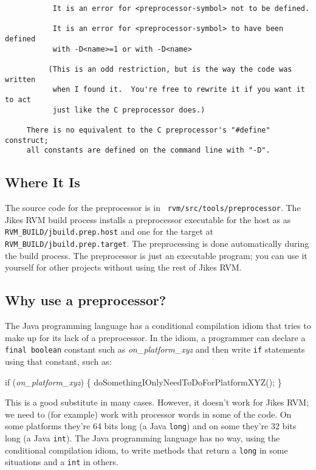\begin{verbatim}
           It is an error for <preprocessor-symbol> not to be defined.

           It is an error for <preprocessor-symbol> to have been defined
           with -D<name>=1 or with -D<name>

          (This is an odd restriction, but is the way the code was written
           when I found it.  You're free to rewrite it if you want it to act
           just like the C preprocessor does.)

     There is no equivalent to the C preprocessor's "#define" construct;
     all constants are defined on the command line with "-D".
\end{verbatim}

\subsection{Where It Is}

The source code for the preprocessor is in {\tt
  rvm/src/tools/preprocessor}.  The Jikes RVM build process installs a
preprocessor executable for the host as as {\tt
  RVM\_BUILD/jbuild.prep.host} and one for the target at {\tt
  RVM\_BUILD/jbuild.prep.target}.  The preprocessing is done
automatically during the build process.  The preprocessor is just an
executable program; you can use it yourself for other projects without
using the rest of Jikes RVM.\@


\subsection{Why use a preprocessor?}

The Java programming language has a conditional compilation idiom that tries to make up for its
lack of a preprocessor.  In the idiom, a programmer can
declare a {\tt final boolean} constant such as {\it on\_platform\_xyz}
and then write {\tt if} statements using that constant, such as:
\begin{example}
if ({\it on\_platform\_xyz}) \{
   doSomethingIOnlyNeedToDoForPlatformXYZ();
\}    
\end{example}

This is a good substitute in many cases.  However, it doesn't work for
Jikes RVM; we need to (for example) work with processor words in some of
the code.  On some platforms they're 64 bits long (a Java {\tt long})
and on some they're 32 bits long (a Java {\tt int}).  The Java
programming language has no way,
using the conditional compilation idiom, to write methods that return
a {\tt long} in some situations and a {\tt int} in others.

